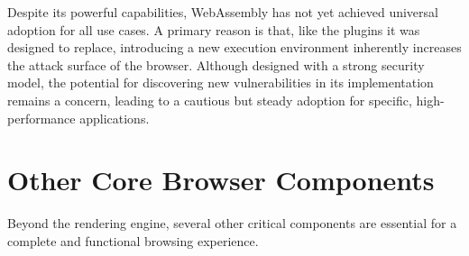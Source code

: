 \documentclass{scrbook}
\begin{document}
Despite its powerful capabilities, WebAssembly has not yet achieved universal adoption for all use cases. A primary reason is that, like the plugins it was designed to replace, introducing a new execution environment inherently increases the attack surface of the browser. Although designed with a strong security model, the potential for discovering new vulnerabilities in its implementation remains a concern, leading to a cautious but steady adoption for specific, high-performance applications.

\chapter{Other Core Browser Components}

Beyond the rendering engine, several other critical components are essential for a complete and functional browsing experience.
\end{document}
